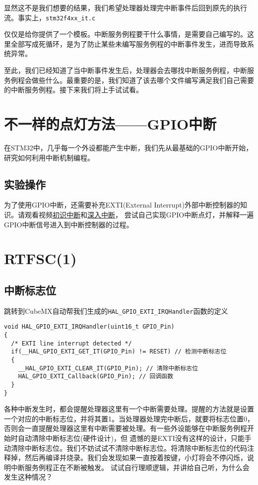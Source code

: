 显然这不是我们想要的结果，我们希望处理器处理完中断事件后回到原先的执行流。事实上，\verb|stm32f4xx_it.c|

\noindent 仅仅是给你提供了一个模板。中断服务例程要干什么事情，是需要自己编写的。这里全部写成死循环，是为了防止某些未编写服务例程的中断事件发生，进而导致系统异常。

至此，我们已经知道了当中断事件发生后，处理器会去哪找中断服务例程，中断服务例程会做些什么。最重要的是，我们知道了该去哪个文件编写满足我们自己需要的中断服务例程。接下来我们将上手试试看。

\section{不一样的点灯方法——GPIO中断}
在STM32中，几乎每一个外设都能产生中断，我们先从最基础的GPIO中断开始，研究如何利用中断机制编程。

\subsection{实验操作}
为了使用GPIO中断，还需要补充EXTI(External Interrupt)外部中断控制器的知识。请观看视频\href{【【keysking的stm32教程】 第6集 狂飙STM32中断】 https://www.bilibili.com/video/BV1Fj411V7aq/?share_source=copy_web&vd_source=00b9d329964a93c9843f9c524074f948}{初识中断}和\href{https://www.bilibili.com/video/BV1M24y1473t/?share_source=copy_web&vd_source=00b9d329964a93c9843f9c524074f948}{深入中断}，
尝试自己实现GPIO中断点灯，并解释一遍GPIO中断信号进入到中断控制器的过程。

\section{RTFSC(1)}
\subsection{中断标志位}
跳转到CubeMX自动帮我们生成的\verb|HAL_GPIO_EXTI_IRQHandler|函数的定义
\begin{lstlisting}
void HAL_GPIO_EXTI_IRQHandler(uint16_t GPIO_Pin)
{
  /* EXTI line interrupt detected */
  if(__HAL_GPIO_EXTI_GET_IT(GPIO_Pin) != RESET) // 检测中断标志位
  {
    __HAL_GPIO_EXTI_CLEAR_IT(GPIO_Pin); // 清除中断标志位
    HAL_GPIO_EXTI_Callback(GPIO_Pin); // 回调函数
  }
}
\end{lstlisting}
各种中断发生时，都会提醒处理器这里有一个中断需要处理。提醒的方法就是设置一个对应的中断标志位，并将其置1。当处理器处理完中断后，就要将标志位置0，否则会一直提醒处理器这里有中断需要被处理。有一些外设能够在中断服务例程开始时自动清除中断标志位(硬件设计)，但
遗憾的是EXTI没有这样的设计，只能手动清除中断标志位。我们不妨试试不清除中断标志位。将清除中断标志位的代码注释掉，然后再编译并烧录。我们会发现如果一直按着按键，小灯将会不停闪烁，说明中断服务例程正在不断被触发。
试试自行理顺逻辑，并讲给自己听，为什么会发生这种情况？

